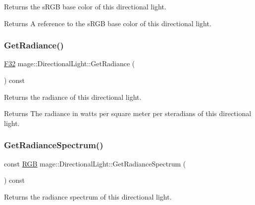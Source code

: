 Returns the s\+R\+GB base color of this directional light.

\begin{DoxyReturn}{Returns}
A reference to the s\+R\+GB base color of this directional light. 
\end{DoxyReturn}
\hypertarget{classmage_1_1_directional_light_a73fe73ce8184bf32379ead1e00b34c9f}{}\label{classmage_1_1_directional_light_a73fe73ce8184bf32379ead1e00b34c9f} 
\subsubsection{\texorpdfstring{Get\+Radiance()}{GetRadiance()}}
{\footnotesize\ttfamily \hyperlink{namespacemage_aa97e833b45f06d60a0a9c4fc22ae02c0}{F32} mage\+::\+Directional\+Light\+::\+Get\+Radiance (\begin{DoxyParamCaption}{ }\end{DoxyParamCaption}) const\hspace{0.3cm}{\ttfamily [noexcept]}}

Returns the radiance of this directional light.

\begin{DoxyReturn}{Returns}
The radiance in watts per square meter per steradians of this directional light. 
\end{DoxyReturn}
\hypertarget{classmage_1_1_directional_light_a137cef14d20df2c907884a04ae2019ff}{}\label{classmage_1_1_directional_light_a137cef14d20df2c907884a04ae2019ff} 
\subsubsection{\texorpdfstring{Get\+Radiance\+Spectrum()}{GetRadianceSpectrum()}}
{\footnotesize\ttfamily const \hyperlink{structmage_1_1_r_g_b}{R\+GB} mage\+::\+Directional\+Light\+::\+Get\+Radiance\+Spectrum (\begin{DoxyParamCaption}{ }\end{DoxyParamCaption}) const\hspace{0.3cm}{\ttfamily [noexcept]}}

Returns the radiance spectrum of this directional light.

